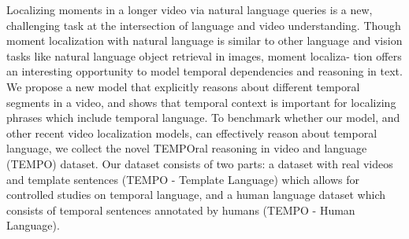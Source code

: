 Localizing moments in a longer video via natural language queries is a new, challenging task at the intersection of language and video understanding. Though moment localization with natural language is similar to other language and vision tasks like natural language object retrieval in images, moment localiza- tion offers an interesting opportunity to model temporal dependencies and reasoning in text. We propose a new model that explicitly reasons about different temporal segments in a video, and shows that temporal context is important for localizing phrases which include temporal language. To benchmark whether our model, and other recent video localization models, can effectively reason about temporal language, we collect the novel TEMPOral reasoning in video and language (TEMPO) dataset. Our dataset consists of two parts: a dataset with real videos and template sentences (TEMPO - Template Language) which allows for controlled studies on temporal language, and a human language dataset which consists of temporal sentences annotated by humans (TEMPO - Human Language).
